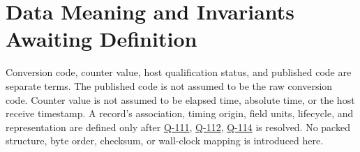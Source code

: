 \section{Data Meaning and Invariants Awaiting Definition}
\label{Section:DataMeaning}
Conversion code, counter value, host qualification status, and published code are separate terms. The published code is not assumed to be the raw conversion code. Counter value is not assumed to be elapsed time, absolute time, or the host receive timestamp. A record's association, timing origin, field units, lifecycle, and representation are defined only after \hyperref[Question:Q-111]{Q-111}, \hyperref[Question:Q-112]{Q-112}, \hyperref[Question:Q-114]{Q-114} is resolved. No packed structure, byte order, checksum, or wall-clock mapping is introduced here.
